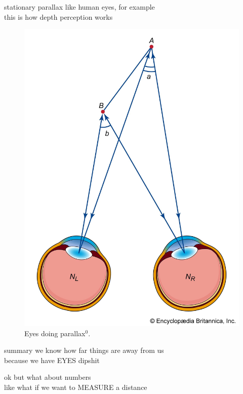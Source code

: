 \documentclass[12pt]{beamer}
\begin{document}
        \begin{frame}{stationary parallax} \centering
            like human eyes, for example\\
            this is how depth perception works
            \begin{figure}
                \includegraphics[scale=0.06, bb=0 0 1400 2000, fbox]{parallaxeyes.jpg}
                \caption{Eyes doing parallax$^0$.}
            \end{figure}
        \end{frame}
        \begin{frame}{summary} \centering
            we know how far things are away from us\\because we have EYES dipshit
        \end{frame}
        \begin{frame} \centering
            ok but what about numbers\\
            \vspace{2em}
            like what if we want to MEASURE a distance
        \end{frame}
        \begin{frame}
            \tableofcontents
        \end{frame}
\end{document}
